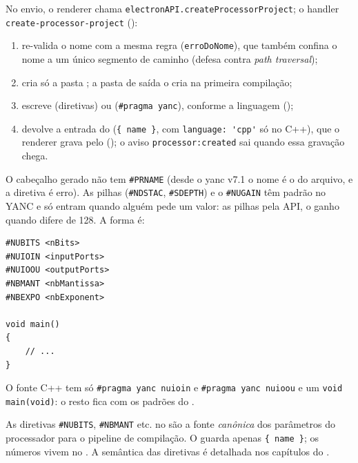 No envio, o renderer chama \lstinline|electronAPI.createProcessorProject|; o
handler \lstinline|create-processor-project| ():

\begin{enumerate}[leftmargin=1.8em]
  \item re-valida o nome com a mesma regra (\lstinline|erroDoNome|), que também
    confina o nome a um único segmento de caminho (defesa contra \emph{path
    traversal});
  \item cria só a pasta ; a pasta de saída  o
     cria na primeira compilação;
  \item escreve  (diretivas) ou 
    (\lstinline|#pragma yanc|), conforme a linguagem
    ();
  \item devolve a entrada do  (\lstinline|{ name }|, com
    \lstinline|language: 'cpp'| só no C++), que o renderer grava pelo
     (); o aviso
    \lstinline|processor:created| sai quando essa gravação chega.
\end{enumerate}

O cabeçalho  gerado não tem \lstinline|#PRNAME| (desde o yanc v7.1 o
nome é o do arquivo, e a diretiva é erro). As pilhas (\lstinline|#NDSTAC|,
\lstinline|#SDEPTH|) e o \lstinline|#NUGAIN| têm padrão no YANC e só entram quando
alguém pede um valor: as pilhas pela API, o ganho quando difere de 128. A forma
é:

\begin{lstlisting}[style=cmm]
#NUBITS <nBits>
#NUIOIN <inputPorts>
#NUIOOU <outputPorts>
#NBMANT <nbMantissa>
#NBEXPO <nbExponent>

void main()
{
    // ...
}
\end{lstlisting}

O fonte C++ tem só \lstinline|#pragma yanc nuioin| e \lstinline|#pragma yanc nuioou|
e um \lstinline|void main(void)|: o resto fica com os padrões do .

\begin{nota}
As diretivas \lstinline|#NUBITS|, \lstinline|#NBMANT| etc. no  são a
fonte \emph{canônica} dos parâmetros do processador para o pipeline de
compilação. O  guarda apenas \lstinline|{ name }|; os números vivem
no . A semântica das diretivas é detalhada nos capítulos do
.
\end{nota}

